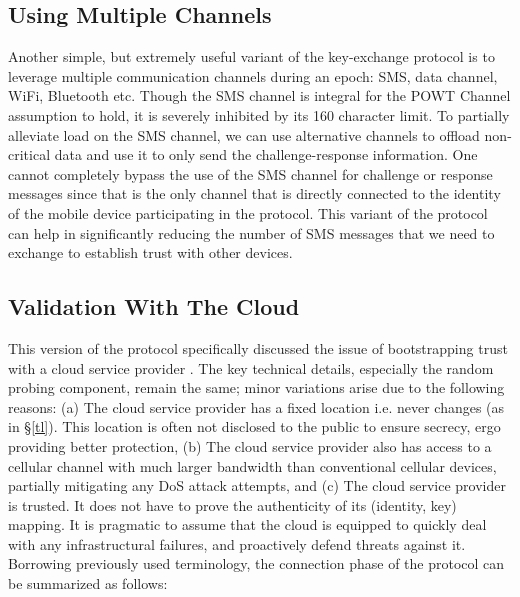 \documentclass[letterpaper,twocolumn]{sig-alternate}
\begin{document}
\subsection{Using Multiple Channels}
\label{multi-path}

Another simple, but extremely useful variant of the key-exchange protocol is to leverage multiple communication channels during an epoch: SMS, data channel, WiFi, Bluetooth etc. Though the SMS channel is integral for the POWT Channel assumption to hold, it is severely inhibited by its 160 character limit. To partially alleviate load on the SMS channel, we can use alternative channels to offload non-critical data and use it to only send the challenge-response information. One cannot completely bypass the use of the SMS channel for challenge or response messages since that is the only channel that is directly connected to the identity of the mobile device participating in the protocol. This variant of the protocol can help in significantly reducing the number of SMS messages that we need to exchange to establish trust with other devices. 

\subsection{Validation With The Cloud} 
\label{cv}

This version of the protocol specifically discussed the issue of bootstrapping trust with a cloud service provider . The key technical details, especially the random probing component, remain the same; minor variations arise due to the following reasons: (a) The cloud service provider has a fixed location i.e.  never changes (as in \S \ref{tl}). This location is often not disclosed to the public to ensure secrecy, ergo providing better protection, (b)  The cloud service provider also has access to a cellular channel with much larger bandwidth than conventional cellular devices, partially mitigating any DoS attack attempts, and (c) The cloud service provider is trusted. It does not have to prove the authenticity of its (identity, key) mapping. It is pragmatic to assume that the cloud is equipped to quickly deal with any infrastructural failures, and proactively defend threats against it. Borrowing previously used terminology, the connection phase of the protocol can be summarized as follows: 

\vspace{-2mm}

\vspace{-6mm}
\end{document}
